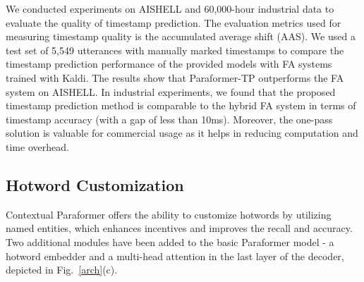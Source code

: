 \documentclass{INTERSPEECH2023}
\begin{document}
\begin{table}[h]
\vspace{-1.5mm}
\centering
\caption{Evaluation of timestamp prediction.}\label{tabel-ts}
\vspace{-1.5mm}
\vspace{-3mm}
\end{table}

We conducted experiments on AISHELL and 60,000-hour industrial data to evaluate the quality of timestamp prediction. The evaluation metrics used for measuring timestamp quality is the accumulated average shift (AAS)\cite{shi2023achieving}. We used a test set of 5,549 utterances with manually marked timestamps to compare the timestamp prediction performance of the provided models with FA systems trained with Kaldi\cite{povey2011kaldi}.
The results show that Paraformer-TP outperforms the FA system on AISHELL. In industrial experiments, we found that the proposed timestamp prediction method is comparable to the hybrid FA system in terms of timestamp accuracy (with a gap of less than 10ms). Moreover, the one-pass solution is valuable for commercial usage as it helps in reducing computation and time overhead.


\subsection{Hotword Customization}
Contextual Paraformer offers the ability to customize hotwords by utilizing named entities, which enhances incentives and improves the recall and accuracy. Two additional modules have been added to the basic Paraformer model - a hotword embedder and a multi-head attention in the last layer of the decoder, depicted in  Fig.~\ref{arch}(c). 
\end{document}
